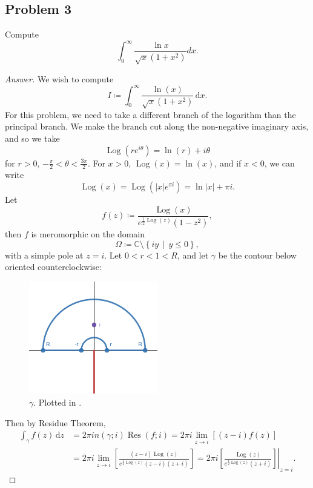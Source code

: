 \documentclass[12pt]{article}
\newcommand{\cx}{\mathbb{C}}
\newcommand\paren[1]{\left( #1 \right)}
\newcommand\setb[1]{\left \{ #1 \right \}}
\newcommand{\sqbrack}[1]{\left [ #1 \right ]}
\newcommand{\abs}[1]{\left| #1 \right|}
\renewcommand{\i}[4]{\int_{#1}^{#2} {#3} \, \mathrm{d} {#4} }
\theoremstyle{definition}
\DeclareMathOperator\Log{Log}
\DeclareMathOperator\Res{Res}
\begin{document}
\subsection{Problem 3 \texorpdfstring{\cite{Melody}}{}}
Compute
\[
    \int_0^{\infty} \frac{\ln x}{\sqrt{x}(1+x^2)} dx.
\]
\begin{proof}[Answer]
    We wish to compute 
    \[
        I \coloneqq \i{0}{\infty}{ \frac{ \ln(x) }{ \sqrt{x} \paren{ 1 + x^2 } } }{x} . 
    \]  
    For this problem, we need to take a different branch of the logarithm than the principal branch. We make the branch cut along the non-negative imaginary axis, and so we take 
    \[
        \Log \paren{ re^{i\theta} } = \ln(r) + i \theta 
    \]
    for $r > 0$, $-\frac{\pi}{2} < \theta < \frac{3\pi}{2}$. For $x > 0$, $\Log(x) =  \ln(x)$, and if $x < 0$, we can write 
    \[
        \Log(x) = \Log \paren{ \abs{x} e^{\pi i} } = \ln \abs{x} + \pi i . 
    \]
    Let 
    \[
        f(z) \coloneqq \frac{\Log(x)}{ e^{\frac{1}{2} \Log(z)} \paren{ 1 - z^2 } } , 
    \]
    then $f$ is meromorphic on the domain
    \[
        \Omega \coloneqq \cx \setminus \setb{ iy \, \middle| \, y \leq 0 } ,
    \]
    with a simple pole at $z = i$. Let $0 < r < 1 < R$, and let $\gamma$ be the contour below oriented counterclockwise: 
    \begin{figure}[H]
        \centering
        \includegraphics[width = 0.5\textwidth]{11.png}
        \caption{$\gamma$. Plotted in \cite{Desmos}.}
        \label{fig:fig11}
    \end{figure}
    Then by Residue Theorem, 
    \begin{align*}
        \i{\gamma}{}{f(z)}{z} & = 2\pi i n(\gamma;i) \Res(f;i) = 2\pi i \lim\limits_{z \to i} \sqbrack{ (z - i) f(z) } \\ 
        & = 2\pi i \lim\limits_{z \to i} \sqbrack{ \frac{(z-i) \Log(z)}{e^{\frac{1}{2}\Log(z)}(z - i)(z + i)}  } = 2\pi i \left. \sqbrack{ \frac{ \Log(z)}{e^{\frac{1}{2}\Log(z)}(z + i)} } \right|_{z = i} . 

\end{align*}
\end{proof}
\end{document}
